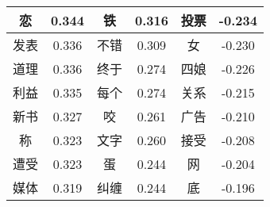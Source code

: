 \documentclass[11pt]{article}
\newcommand{\1}[1]{{\mathbf 1}\left\{#1\right\}}        %
\begin{document}
\begin{table}
\begin{center}
\begin{tabular}{|c|c||c|c||c|c|}
恋 & 0.344 & 铁 & 0.316 & 投票 & -0.234\\ \hline
发表 & 0.336 & 不错 & 0.309 & 女 & -0.230\\ \hline
道理 & 0.336 & 终于 & 0.274 & 四娘 & -0.226\\ \hline
利益 & 0.335 & 每个 & 0.274 & 关系 & -0.215\\ \hline
新书 & 0.327 & 咬 & 0.261 & 广告 & -0.210\\ \hline
称 & 0.323 & 文字 & 0.260 & 接受 & -0.208\\ \hline
遭受 & 0.323 & 蛋 & 0.244 & 网 & -0.204\\ \hline
媒体 & 0.319 & 纠缠 & 0.244 & 底 & -0.196\\ \hline
\end{tabular}
\end{center}
\end{table}
\end{document}
